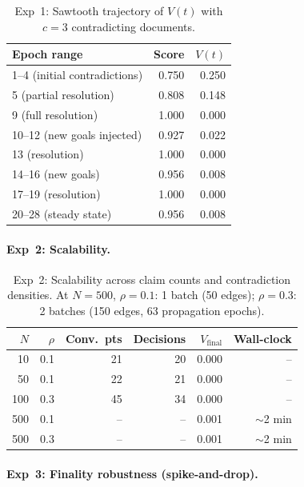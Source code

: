 \documentclass[11pt]{article}
\begin{document}
\begin{table}[H]
\centering
\small
\begin{tabular}{lrr}
\toprule
\textbf{Epoch range} & \textbf{Score} & $V(t)$ \\
\midrule
1--4 (initial contradictions) & 0.750 & 0.250 \\
5 (partial resolution) & 0.808 & 0.148 \\
9 (full resolution) & 1.000 & 0.000 \\
10--12 (new goals injected) & 0.927 & 0.022 \\
13 (resolution) & 1.000 & 0.000 \\
14--16 (new goals) & 0.956 & 0.008 \\
17--19 (resolution) & 1.000 & 0.000 \\
20--28 (steady state) & 0.956 & 0.008 \\
\bottomrule
\end{tabular}
\caption{Exp~1: Sawtooth trajectory of $V(t)$ with $c{=}3$ contradicting documents.}
\end{table}

\paragraph{Exp~2: Scalability.}

\begin{table}[H]
\centering
\small
\begin{tabular}{rrrrrr}
\toprule
$N$ & $\rho$ & \textbf{Conv.\ pts} & \textbf{Decisions} & \textbf{$V_{\text{final}}$} & \textbf{Wall-clock} \\
\midrule
10  & 0.1 & 21 & 20 & 0.000 & -- \\
50  & 0.1 & 22 & 21 & 0.000 & -- \\
100 & 0.3 & 45 & 34 & 0.000 & -- \\
500 & 0.1 & -- & -- & 0.001 & $\sim$2 min \\
500 & 0.3 & -- & -- & 0.001 & $\sim$2 min \\
\bottomrule
\end{tabular}
\caption{Exp~2: Scalability across claim counts and contradiction densities.
At $N{=}500$, $\rho{=}0.1$: 1 batch (50 edges); $\rho{=}0.3$: 2 batches (150 edges, 63 propagation epochs).}
\end{table}

\paragraph{Exp~3: Finality robustness (spike-and-drop).}
\end{document}
